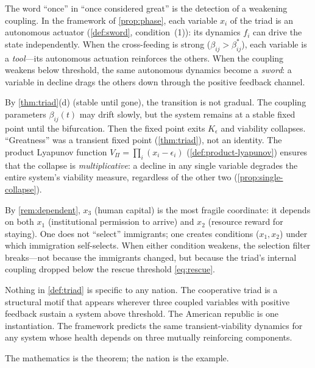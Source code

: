 \begin{remark}
\label{rem:triad-sword}
The word ``once'' in ``once considered great'' is the detection
of a weakening coupling.  In the framework of \cref{prop:phase},
each variable $x_i$ of the triad is an autonomous actuator
(\cref{def:sword}, condition~(1)): its dynamics $f_i$ can drive
the state independently.  When the cross-feeding is strong
($\beta_{ij} > \beta_{ij}^*$), each variable is a
\emph{tool}---its autonomous actuation reinforces the others.
When the coupling weakens below threshold, the same autonomous
dynamics become a \emph{sword}: a variable in decline drags the
others down through the positive feedback channel.

By \cref{thm:triad}(d) (stable until gone), the transition is
not gradual.  The coupling parameters $\beta_{ij}(t)$ may drift
slowly, but the system remains at a stable fixed point until the
bifurcation.  Then the fixed point exits $K_\epsilon$ and
viability collapses.  ``Greatness'' was a transient fixed point
(\cref{thm:triad}), not an identity.  The product Lyapunov
function $V_\Pi = \prod_i (x_i - \epsilon_i)$
(\cref{def:product-lyapunov}) ensures that the collapse is
\emph{multiplicative}: a decline in any single variable degrades
the entire system's viability measure, regardless of the other
two (\cref{prop:single-collapse}).

By \cref{rem:dependent}, $x_3$ (human capital) is the most
fragile coordinate: it depends on both $x_1$ (institutional
permission to arrive) and $x_2$ (resource reward for staying).
One does not ``select'' immigrants; one creates conditions
($x_1, x_2$) under which immigration self-selects.  When either
condition weakens, the selection filter breaks---not because
the immigrants changed, but because the triad's internal
coupling dropped below the rescue threshold
\eqref{eq:rescue}.
\end{remark}

\begin{remark}\label{rem:not-american}
Nothing in \cref{def:triad} is specific to any nation.
The cooperative triad is a structural motif that appears wherever
three coupled variables with positive feedback sustain a system
above threshold.  The American republic is one instantiation.
The framework predicts the same transient-viability dynamics for
any system whose health depends on three mutually reinforcing
components.

The mathematics is the theorem; the nation is the example.
\end{remark}

